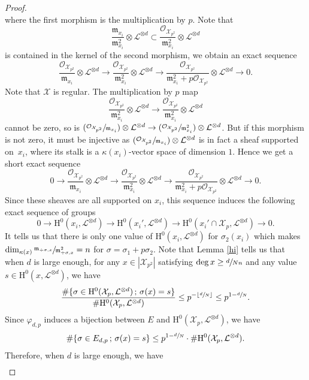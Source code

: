 \documentclass[JEP,XML,SOM,Unicode,published]{cedram}
\newcommand{\Psfrac}[2]{(\sfrac{#1}{#2})}
\newcommand{\sep}{\,;\,}
\theoremstyle{plain}
\theoremstyle{definition}
\newcommand{\ho}{\mathrm{H}}
\newcommand{\X}{\mathcal{X}}
\newcommand{\li}{\mathcal{L}}
\begin{document}
\begin{proof}
\[\]
where the first morphism is the multiplication by $p$. Note that
\[
\frac{\mathfrak{m}_{x_i}}{\mathfrak{m}_{x_i}^2}\otimes \li^{\otimes d}\subset \frac{\mathcal{O}_{\X_{p^2}}}{\mathfrak{m}_{x_i}^2}\otimes \li^{\otimes d}
\]
is contained in the kernel of the second morphism, we obtain an exact sequence
\[
\frac{\mathcal{O}_{\X_{p^2}}}{\mathfrak{m}_{x_i}}\otimes \li^{\otimes d} \to \frac{\mathcal{O}_{\X_{p^2}}}{\mathfrak{m}_{x_i}^2}\otimes \li^{\otimes d} \to \frac{\mathcal{O}_{\X_{p^2}}}{\mathfrak{m}_{x_i}^2+p\mathcal{O}_{\X_{p^2}}}\otimes \li^{\otimes d}\to 0.
\]
Note that $\X$ is regular. The multiplication by $p$ map
\[
\frac{\mathcal{O}_{\X_{p^2}}}{\mathfrak{m}_{x_i}^2}\otimes \li^{\otimes d} \to \frac{\mathcal{O}_{\X_{p^2}}}{\mathfrak{m}_{x_i}^2}\otimes \li^{\otimes d}
\]
cannot be zero, so is $ \Psfrac{\mathcal{O}_{\X_{p^2}}}{\mathfrak{m}_{x_i}}\otimes \li^{\otimes d} \to \Psfrac{\mathcal{O}_{\X_{p^2}}}{\mathfrak{m}_{x_i}^2}\otimes \li^{\otimes d}$. But if this morphism is not zero, it must be injective as $\Psfrac{\mathcal{O}_{\X_{p^2}}}{\mathfrak{m}_{x_i}}\otimes \li^{\otimes d} $ is in fact a sheaf supported on~$x_i$, where its stalk is a $\kappa(x_i)$-vector space of dimension $1$. Hence we get a short exact sequence
\[
0\to \frac{\mathcal{O}_{\X_{p^2}}}{\mathfrak{m}_{x_i}}\otimes \li^{\otimes d} \to \frac{\mathcal{O}_{\X_{p^2}}}{\mathfrak{m}_{x_i}^2}\otimes \li^{\otimes d} \to \frac{\mathcal{O}_{\X_{p^2}}}{\mathfrak{m}_{x_i}^2+p\mathcal{O}_{\X_{p^2}}}\otimes \li^{\otimes d}\to 0.
\]
Since these sheaves are all supported on $x_i$, this sequence induces the following exact sequence of groups
\[
0\to \ho^0(x_i, \li^{\otimes d})\to \ho^0(x_i', \li^{\otimes d}) \to \ho^0(x_i'\cap \X_p, \li^{\otimes d}) \to 0.
\]
It tells us that there is only one value of $ \ho^0(x_i, \li^{\otimes d})$ for $\sigma_2(x_i)$ which makes $\dim_{\kappa(x)}\sfrac{\mathfrak{m}_{\div \sigma,x}}{\mathfrak{m}_{\div \sigma,x}^2}=n$ for $\sigma=\sigma_1+p\sigma_2$. Note that Lemma \ref{hi} tells us that when $d$ is large enough, for any $x\in |\X_{p^2}|$ satisfying $\deg x\geq \sfrac{d}{Nn}$ and any value $s\in \ho^0(x,\li^{\otimes d})$, we have
\[
\frac{\#\{ \sigma\in \ho^0(\X_p, \li^{\otimes d})\sep \sigma(x)=s \} }{\#\ho^0(\X_p,\li^{\otimes d})} \leq p^{-\lfloor\sfrac{d}{N}\rfloor} \leq p^{1-\sfrac{d}{N}}.
\]
Since $\varphi_{d,p}$ induces a bijection between $E$ and $\ho^0(\X_p, \li^{\otimes d})$, we have
\[
\#\{ \sigma\in E_{d,p}\sep \sigma(x)=s \} \leq p^{1-\sfrac{d}{N}}\cdot \#\ho^0(\X_p, \li^{\otimes d}).
\]
Therefore, when $d$ is large enough, we have
\begin{multline*}

\end{multline*}
\end{proof}
\end{document}
